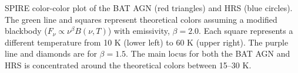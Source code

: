 \label{fig:color-color} SPIRE color-color plot of the BAT AGN (red triangles) and HRS (blue circles). The green line and squares represent theoretical colors assuming a modified blackbody ($F_{\nu} \propto \nu^{\beta}B(\nu, T)$) with emissivity, $\beta=2.0$. Each square represents a different temperature from 10 K (lower left) to 60 K (upper right). The purple line and diamonds are for $\beta=1.5$. The main locus for both the BAT AGN and HRS is concentrated around the theoretical colors between 15--30 K. 
  
  